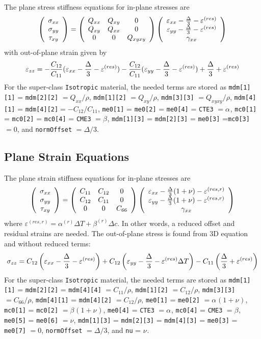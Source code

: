 \documentclass[11pt]{article}
\def\a#1{\alpha_{#1}}
\def\b#1{\beta_{#1}}
\def\code#1{{\small\tt #1}}
\def\DT{\Delta T}
\def\e#1{\varepsilon_{#1}}
\def\er#1{\varepsilon_{#1}^{(res)}}
\def\err#1{\varepsilon_{#1}^{(res,r)}}
\def\g#1{\gamma_{#1}}
\def\s#1{\sigma_{#1}}
\def\t#1{\tau_{#1}}
\def\v#1{\nu_{#1}}
\def\vvec#1#2#3{\left(\begin{array}{ccc} #1 \\ #2 \\ #3 \end{array}\right)}
\def\symmat#1#2#3#4#5#6{\left(\begin{array}{ccc} #1 & #2 & #3 \\ #2 & #4 & #5 \\
                                                      #3 & #5 & #6 \end{array}\right)}
\begin{document}
The plane stress stiffness equations for in-plane stresses are
\begin{equation}
      \vvec{\s{xx}}{\s{yy}}{\t{xy}} = \symmat{Q_{xx}}{Q_{xy}}{0}{Q_{xx}}{0}{Q_{xyxy}}
          \vvec{\e{xx}- {\Delta\over 3}  - \er{}}{\e{yy}- {\Delta\over 3}  - \er{}}{\g{xx}}
 \end{equation}
with out-of-plane strain given  by
\begin{equation}
            \e{zz} = -{C_{12}\over C_{11}}(\e{xx}- {\Delta\over 3} -\er{}) - {C_{12}\over C_{11}}(\e{yy} - {\Delta\over 3}-\er{}) 
                   + {\Delta\over 3}  + \er{}
\end{equation}
For the super-class \code{Isotropic} material, the needed terms are stored as \code{mdm[1][1]} = \code{mdm[2][2]} $= Q_{xx}/\rho$,  \code{mdm[1][2]} $= Q_{xy}/\rho$,  \code{mdm[3][3]} $= Q_{xyxy}/\rho$,  \code{mdm[4][1]} =  \code{mdm[4][2]}$= -C_{12}/C_{11}$,  \code{me0[1]} = \code{me0[2]} = \code{me0[4]} = \code{CTE3}  $=\a{}$, \code{mc0[1]} = \code{mc0[2]} = \code{mc0[4]} = \code{CME3}  $=\b{}$, \code{mdm[1][3]} = \code{mdm[2][3]} = \code{me0[3]} =\code{mc0[3]} $=0$, and \code{normOffset} $=\Delta/3$.

\subsection{Plane Strain Equations}

The plane strain stiffness equations for in-plane stresses are
\begin{equation}
      \vvec{\s{xx}}{\s{yy}}{\t{xy}} = \symmat{C_{11}}{C_{12}}{0}{C_{11}}{0}{C_{66}}
          \vvec{\e{xx} - {\Delta\over 3}(1+\nu) - \err{}}{\e{yy} - {\Delta\over 3}(1+\nu)  - \err{}}{\g{xx}}
 \end{equation}
 where $\err{}=\a{}^{(r)}\DT+\b{}^{(r)}\Delta c$.
 In other words, a reduced offset and residual strains are needed. The out-of-plane stress is found from 3D equation and without reduced terms:
 \begin{equation}
            \s{zz} = C_{12}\left(\e{xx} - {\Delta\over 3} -\er{}\right) 
                            +C_{12}\left(\e{yy} - {\Delta\over 3} -\er{}\DT\right) 
                            -C_{11}\left({\Delta\over 3} +\er{}\right) 
\end{equation}
For the super-class \code{Isotropic} material, the needed terms are stored as \code{mdm[1][1]} = \code{mdm[2][2]} = \code{mdm[4][4]} $= C_{11}/\rho$,  \code{mdm[1][2]} $= C_{12}/\rho$,  \code{mdm[3][3]} $= C_{66}/\rho$,  \code{mdm[4][1]} =  \code{mdm[4][2]} $= C_{12}/\rho$, \code{me0[1]} = \code{me0[2]} $=\a{}(1+\v{})$, \code{mc0[1]} = \code{mc0[2]} $=\b{}(1+\v{})$, \code{me0[4]} = \code{CTE3} $=\a{}$, \code{mc0[4]} = \code{CME3} $=\b{}$, \code{me0[5]} = \code{me0[6]} $=\nu$, \code{mdm[1][3]} = \code{mdm[2][3]} = \code{mdm[4][3]} = \code{me0[3]} = \code{me0[7]} $=0$, \code{normOffset} $=\Delta/3$, and \code{nu} = $\v{}$.
\end{document}
